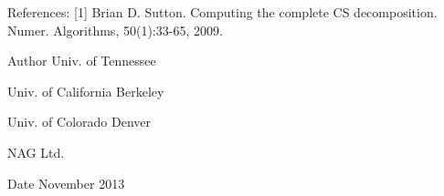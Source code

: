 \begin{DoxyParagraph}{References\+: }
\mbox{[}1\mbox{]} Brian D. Sutton. Computing the complete C\+S decomposition. Numer. Algorithms, 50(1)\+:33-\/65, 2009. 
\end{DoxyParagraph}
\begin{DoxyAuthor}{Author}
Univ. of Tennessee 

Univ. of California Berkeley 

Univ. of Colorado Denver 

N\+A\+G Ltd. 
\end{DoxyAuthor}
\begin{DoxyDate}{Date}
November 2013 
\end{DoxyDate}
